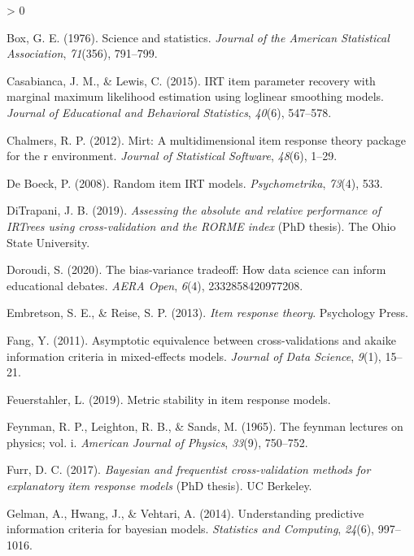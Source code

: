 \documentclass[
  english,
  man,floatsintext]{apa7}
\newlength{\cslhangindent}
\newenvironment{CSLReferences}[2] %
 {%
  \setlength{\parindent}{0pt}
  \ifodd #1 \everypar{\setlength{\hangindent}{\cslhangindent}}\ignorespaces\fi
  \ifnum #2 > 0
  \setlength{\parskip}{#2\baselineskip}
  \fi
 }%
 {}
\begin{document}
\begin{CSLReferences}{1}{0}
\leavevmode\hypertarget{ref-box1976science}{}%
Box, G. E. (1976). Science and statistics. \emph{Journal of the American Statistical Association}, \emph{71}(356), 791--799.

\leavevmode\hypertarget{ref-casabianca2015irt}{}%
Casabianca, J. M., \& Lewis, C. (2015). IRT item parameter recovery with marginal maximum likelihood estimation using loglinear smoothing models. \emph{Journal of Educational and Behavioral Statistics}, \emph{40}(6), 547--578.

\leavevmode\hypertarget{ref-chalmers2012mirt}{}%
Chalmers, R. P. (2012). Mirt: A multidimensional item response theory package for the r environment. \emph{Journal of Statistical Software}, \emph{48}(6), 1--29.

\leavevmode\hypertarget{ref-de2008random}{}%
De Boeck, P. (2008). Random item IRT models. \emph{Psychometrika}, \emph{73}(4), 533.

\leavevmode\hypertarget{ref-ditrapani2019assessing}{}%
DiTrapani, J. B. (2019). \emph{Assessing the absolute and relative performance of IRTrees using cross-validation and the RORME index} (PhD thesis). The Ohio State University.

\leavevmode\hypertarget{ref-doroudi2020bias}{}%
Doroudi, S. (2020). The bias-variance tradeoff: How data science can inform educational debates. \emph{AERA Open}, \emph{6}(4), 2332858420977208.

\leavevmode\hypertarget{ref-embretson2013item}{}%
Embretson, S. E., \& Reise, S. P. (2013). \emph{Item response theory}. Psychology Press.

\leavevmode\hypertarget{ref-fang2011asymptotic}{}%
Fang, Y. (2011). Asymptotic equivalence between cross-validations and akaike information criteria in mixed-effects models. \emph{Journal of Data Science}, \emph{9}(1), 15--21.

\leavevmode\hypertarget{ref-feuerstahlercharacterizing}{}%
Feuerstahler, L. (2019). Metric stability in item response models.

\leavevmode\hypertarget{ref-feynman1965feynman}{}%
Feynman, R. P., Leighton, R. B., \& Sands, M. (1965). The feynman lectures on physics; vol. i. \emph{American Journal of Physics}, \emph{33}(9), 750--752.

\leavevmode\hypertarget{ref-furr2017bayesian}{}%
Furr, D. C. (2017). \emph{Bayesian and frequentist cross-validation methods for explanatory item response models} (PhD thesis). UC Berkeley.

\leavevmode\hypertarget{ref-gelman2014understanding}{}%
Gelman, A., Hwang, J., \& Vehtari, A. (2014). Understanding predictive information criteria for bayesian models. \emph{Statistics and Computing}, \emph{24}(6), 997--1016.


\end{CSLReferences}
\end{document}
